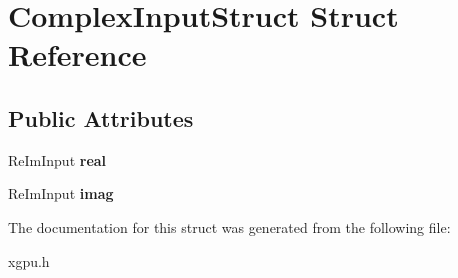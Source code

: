 \hypertarget{struct_complex_input_struct}{}\section{Complex\+Input\+Struct Struct Reference}
\label{struct_complex_input_struct}
\subsection*{Public Attributes}
\begin{DoxyCompactItemize}
\item 
Re\+Im\+Input {\bfseries real}\hypertarget{struct_complex_input_struct_ae8f48adcd7cc42f74282493ab941cfee}{}\label{struct_complex_input_struct_ae8f48adcd7cc42f74282493ab941cfee}

\item 
Re\+Im\+Input {\bfseries imag}\hypertarget{struct_complex_input_struct_a0fcdc540497a6b971581a5f08d248101}{}\label{struct_complex_input_struct_a0fcdc540497a6b971581a5f08d248101}

\end{DoxyCompactItemize}


The documentation for this struct was generated from the following file\+:\begin{DoxyCompactItemize}
\item 
xgpu.\+h\end{DoxyCompactItemize}
